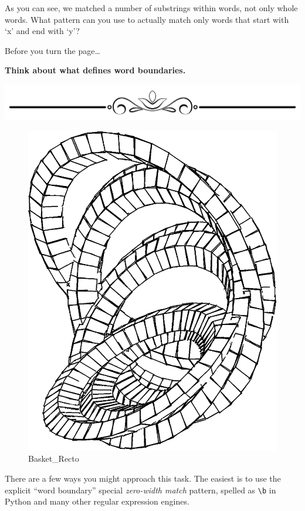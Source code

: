 As you can see, we matched a number of substrings within words, not only
whole words. What pattern can you use to actually match only words that
start with `x' and end with `y'?

Before you turn the page\ldots{}

\textbf{Think about what defines word boundaries.}

\includegraphics{images/Elegant-Flourish-Frame-Extrapolated-19.svg}

\begin{figure}
\centering
\includegraphics{images/Basket_Recto.png}
\caption{Basket\_Recto}
\end{figure}

\newpage

There are a few ways you might approach this task. The easiest is to use
the explicit ``word boundary'' special \emph{zero-width match} pattern,
spelled as \texttt{\textbackslash{}b} in Python and many other regular
expression engines.

